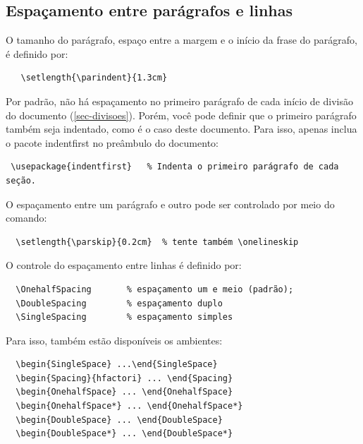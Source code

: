 \documentclass[12pt,oneside,a4paper,chapter=TITLE,english,brazil]{abntex2}
\begin{document}
\begin{anexosenv}
\section{Espaçamento entre parágrafos e linhas}

O tamanho do parágrafo, espaço entre a margem e o início da frase do parágrafo, é definido por:
\begin{verbatim}
   \setlength{\parindent}{1.3cm}
\end{verbatim}

Por padrão, não há espaçamento no primeiro parágrafo de cada início de divisão do documento (\autoref{sec-divisoes}). Porém, você pode definir que o primeiro parágrafo também seja indentado, como é o caso deste documento. Para isso, apenas inclua o pacote \textsf{indentfirst} no preâmbulo do documento:
\begin{verbatim}
 \usepackage{indentfirst}   % Indenta o primeiro parágrafo de cada seção.
\end{verbatim}

O espaçamento entre um parágrafo e outro pode ser controlado por meio do comando:
\begin{verbatim}
  \setlength{\parskip}{0.2cm}  % tente também \onelineskip
\end{verbatim}

O controle do espaçamento entre linhas é definido por:
\begin{verbatim}
  \OnehalfSpacing       % espaçamento um e meio (padrão); 
  \DoubleSpacing        % espaçamento duplo
  \SingleSpacing        % espaçamento simples	
\end{verbatim}

Para isso, também estão disponíveis os ambientes:
\begin{verbatim}
  \begin{SingleSpace} ...\end{SingleSpace}
  \begin{Spacing}{hfactori} ... \end{Spacing}
  \begin{OnehalfSpace} ... \end{OnehalfSpace}
  \begin{OnehalfSpace*} ... \end{OnehalfSpace*}
  \begin{DoubleSpace} ... \end{DoubleSpace}
  \begin{DoubleSpace*} ... \end{DoubleSpace*} 
\end{verbatim}


\end{anexosenv}
\end{document}
